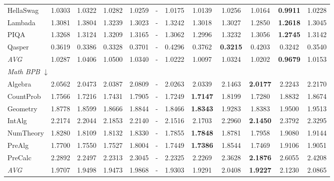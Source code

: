 \begin{table}[htbp]
\begin{tabular}{lccccccccccc}
HellaSwag & 1.0303 & 1.0322 & 1.0282 & 1.0259 & - & 1.0175 & 1.0139 & 1.0256 & 1.0164 & \textbf{0.9911} & 1.0228 \\
Lambada & 1.3081 & 1.3804 & 1.3239 & 1.3023 & - & 1.3242 & 1.3018 & 1.3027 & 1.2850 & \textbf{1.2618} & 1.3045 \\
PIQA & 1.3268 & 1.3124 & 1.3209 & 1.3165 & - & 1.3062 & 1.2996 & 1.3232 & 1.3056 & \textbf{1.2745} & 1.3142 \\
Qasper & 0.3619 & 0.3386 & 0.3328 & 0.3701 & - & 0.4296 & 0.3762 & \textbf{0.3215} & 0.4203 & 0.3242 & 0.3540 \\
\textit{AVG} & 1.0287 & 1.0406 & 1.0500 & 1.0340 & - & 1.0222 & 1.0097 & 1.0324 & 1.0202 & \textbf{0.9679} & 1.0153 \\
\midrule
\multicolumn{12}{l}{\textit{Math BPB} $\downarrow$} \\
Algebra & 2.0562 & 2.0473 & 2.0387 & 2.0809 & - & 2.0263 & 2.0339 & 2.1463 & \textbf{2.0177} & 2.2243 & 2.2170 \\
CountProb & 1.7566 & 1.7216 & 1.7431 & 1.7905 & - & 1.7249 & \textbf{1.7147} & 1.8199 & 1.7280 & 1.8832 & 1.8674 \\
Geometry & 1.8778 & 1.8599 & 1.8666 & 1.8844 & - & 1.8466 & \textbf{1.8343} & 1.9283 & 1.8383 & 1.9500 & 1.9513 \\
IntAlg & 2.2174 & 2.2044 & 2.1853 & 2.2140 & - & 2.1516 & 2.1703 & 2.2960 & \textbf{2.1450} & 2.3792 & 2.3295 \\
NumTheory & 1.8280 & 1.8109 & 1.8132 & 1.8330 & - & 1.7855 & \textbf{1.7848} & 1.8781 & 1.7958 & 1.9080 & 1.9144 \\
PreAlg & 1.7700 & 1.7550 & 1.7527 & 1.8004 & - & 1.7449 & \textbf{1.7386} & 1.8544 & 1.7469 & 1.9106 & 1.9051 \\
PreCalc & 2.2892 & 2.2497 & 2.2313 & 2.3045 & - & 2.2325 & 2.2269 & 2.3628 & \textbf{2.1876} & 2.6055 & 2.4208 \\
\textit{AVG} & 1.9707 & 1.9498 & 1.9473 & 1.9868 & - & 1.9303 & 1.9291 & 2.0408 & \textbf{1.9227} & 2.1230 & 2.0865 \\
\bottomrule
\end{tabular}
\end{table}
